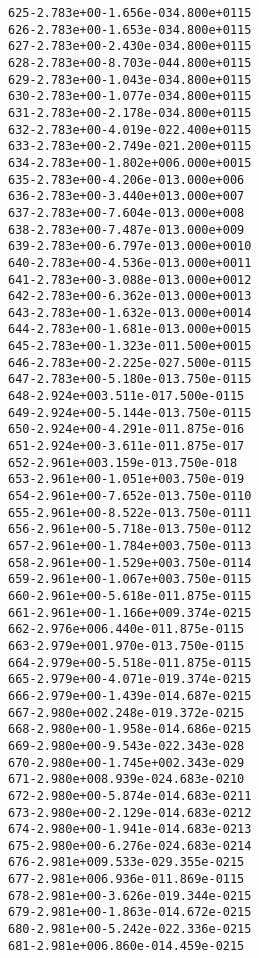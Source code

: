 \begin{alltt}
 625  -2.783e+00  -1.656e-03   4.800e+01   15
 626  -2.783e+00  -1.653e-03   4.800e+01   15
 627  -2.783e+00  -2.430e-03   4.800e+01   15
 628  -2.783e+00  -8.703e-04   4.800e+01   15
 629  -2.783e+00  -1.043e-03   4.800e+01   15
 630  -2.783e+00  -1.077e-03   4.800e+01   15
 631  -2.783e+00  -2.178e-03   4.800e+01   15
 632  -2.783e+00  -4.019e-02   2.400e+01   15
 633  -2.783e+00  -2.749e-02   1.200e+01   15
 634  -2.783e+00  -1.802e+00   6.000e+00   15
 635  -2.783e+00  -4.206e-01   3.000e+00    6
 636  -2.783e+00  -3.440e+01   3.000e+00    7
 637  -2.783e+00  -7.604e-01   3.000e+00    8
 638  -2.783e+00  -7.487e-01   3.000e+00    9
 639  -2.783e+00  -6.797e-01   3.000e+00   10
 640  -2.783e+00  -4.536e-01   3.000e+00   11
 641  -2.783e+00  -3.088e-01   3.000e+00   12
 642  -2.783e+00  -6.362e-01   3.000e+00   13
 643  -2.783e+00  -1.632e-01   3.000e+00   14
 644  -2.783e+00  -1.681e-01   3.000e+00   15
 645  -2.783e+00  -1.323e-01   1.500e+00   15
 646  -2.783e+00  -2.225e-02   7.500e-01   15
 647  -2.783e+00  -5.180e-01   3.750e-01   15
 648  -2.924e+00   3.511e-01   7.500e-01   15
 649  -2.924e+00  -5.144e-01   3.750e-01   15
 650  -2.924e+00  -4.291e-01   1.875e-01    6
 651  -2.924e+00  -3.611e-01   1.875e-01    7
 652  -2.961e+00   3.159e-01   3.750e-01    8
 653  -2.961e+00  -1.051e+00   3.750e-01    9
 654  -2.961e+00  -7.652e-01   3.750e-01   10
 655  -2.961e+00  -8.522e-01   3.750e-01   11
 656  -2.961e+00  -5.718e-01   3.750e-01   12
 657  -2.961e+00  -1.784e+00   3.750e-01   13
 658  -2.961e+00  -1.529e+00   3.750e-01   14
 659  -2.961e+00  -1.067e+00   3.750e-01   15
 660  -2.961e+00  -5.618e-01   1.875e-01   15
 661  -2.961e+00  -1.166e+00   9.374e-02   15
 662  -2.976e+00   6.440e-01   1.875e-01   15
 663  -2.979e+00   1.970e-01   3.750e-01   15
 664  -2.979e+00  -5.518e-01   1.875e-01   15
 665  -2.979e+00  -4.071e-01   9.374e-02   15
 666  -2.979e+00  -1.439e-01   4.687e-02   15
 667  -2.980e+00   2.248e-01   9.372e-02   15
 668  -2.980e+00  -1.958e-01   4.686e-02   15
 669  -2.980e+00  -9.543e-02   2.343e-02    8
 670  -2.980e+00  -1.745e+00   2.343e-02    9
 671  -2.980e+00   8.939e-02   4.683e-02   10
 672  -2.980e+00  -5.874e-01   4.683e-02   11
 673  -2.980e+00  -2.129e-01   4.683e-02   12
 674  -2.980e+00  -1.941e-01   4.683e-02   13
 675  -2.980e+00  -6.276e-02   4.683e-02   14
 676  -2.981e+00   9.533e-02   9.355e-02   15
 677  -2.981e+00   6.936e-01   1.869e-01   15
 678  -2.981e+00  -3.626e-01   9.344e-02   15
 679  -2.981e+00  -1.863e-01   4.672e-02   15
 680  -2.981e+00  -5.242e-02   2.336e-02   15
 681  -2.981e+00   6.860e-01   4.459e-02   15

\end{alltt}

